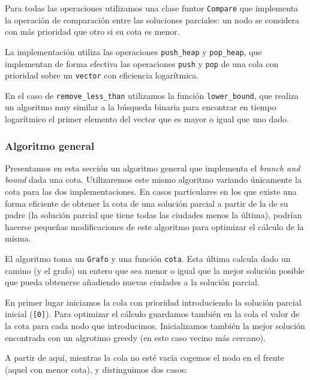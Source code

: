 

Para todas las operaciones utilizamos una clase funtor \texttt{Compare} que implementa
la operación de comparación entre las soluciones parciales: un nodo se considera con más prioridad que otro si su cota es menor.

La implementación utiliza las operaciones \texttt{push\_heap} y \texttt{pop\_heap}, que implementan
de forma efectiva las operaciones \texttt{push} y \texttt{pop} de una cola con prioridad sobre un \texttt{vector} con eficiencia logarítmica.

En el caso de \texttt{remove\_less\_than} utilizamos la función \texttt{lower\_bound},
que realiza un algoritmo muy similar a la búsqueda binaria para encontrar en tiempo
logarítmico el primer elemento del vector que es mayor o igual que uno dado.

\subsubsection{Algoritmo general}

Presentamos en esta sección un algoritmo general que implementa el \textit{branch and bound} dada una cota. Utilizaremos este mismo algoritmo variando únicamente la cota para las dos implementaciones. En casos particulares en los que existe una forma eficiente de obtener la cota de una solución parcial a partir de la de su padre (la solución parcial que tiene todas las ciudades menos la última), podrían hacerse pequeñas modificaciones de este algoritmo para optimizar el cálculo de la misma.

El algoritmo toma un \texttt{Grafo} y una función \texttt{cota}. Esta última calcula dado un camino (y el grafo) un entero que sea menor o igual que la mejor solución posible que pueda obtenerse añadiendo nuevas ciudades a la solución parcial.

En primer lugar iniciamos la cola con prioridad introduciendo la solución parcial
inicial (\texttt{[0]}). Para optimizar el cálculo guardamos también en la cola el valor de la cota para cada nodo que introducimos. Inicializamos también la mejor solución encontrada con un algrotimo greedy (en este caso vecino más cercano).


A partir de aquí, mientras la cola no esté vacía cogemos el nodo en el frente (aquel con menor cota), y distinguimos dos casos:

